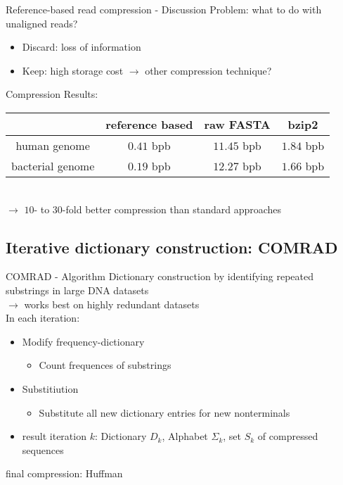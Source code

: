 \documentclass[aspectratio=1610]{beamer}
\begin{document}
\begin{frame}{Reference-based read compression - Discussion}
  Problem: what to do with unaligned reads?
  \begin{itemize}
    \item Discard: loss of information
    \item Keep: high storage cost $\rightarrow$ other compression technique?
  \end{itemize}
  \vspace*{0.5cm}
  Compression Results:\\
  \begin{tabular}{c|ccc}
    & reference based & raw FASTA & bzip2 \\
    \hline
    human genome & $0.41$ bpb & $11.45$ bpb & $1.84$ bpb \\
bacterial genome & $0.19$ bpb & $12.27$ bpb & $1.66$ bpb \\
  \end{tabular}
  \vspace*{0.5cm}\\
  $\rightarrow$ $10$- to $30$-fold better compression than standard approaches
\end{frame}


\subsection{Iterative dictionary construction: COMRAD}
\begin{frame}{COMRAD - Algorithm}%
  Dictionary construction by identifying repeated substrings in large DNA datasets %
     \\ $\rightarrow$ works best on highly redundant datasets\\
      In each iteration:
  \begin{itemize}
    \item Modify frequency-dictionary
    \begin{itemize}
      \item Count frequences of substrings 
    \end{itemize}
  \item Substitiution
    \begin{itemize}
      \item Substitute all new dictionary entries for new nonterminals
    \end{itemize}
  \item result iteration $k$: Dictionary $D_k$, Alphabet $\Sigma _k$, set $S_k$ of compressed sequences
  \end{itemize}
  final compression: Huffman
\end{frame}
\end{document}
